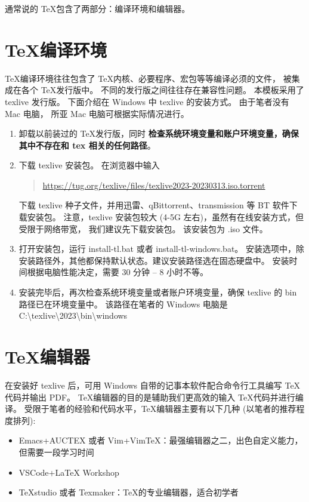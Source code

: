 \documentclass[twoside,doctor]{zjnuthesis}
\begin{document}
通常说的 \TeX 包含了两部分：编译环境和编辑器。 

\section{\TeX 编译环境}

\TeX 编译环境往往包含了 \TeX 内核、必要程序、宏包等等编译必须的文件，
被集成在各个 \TeX 发行版中。
不同的发行版之间往往存在兼容性问题。
本模板采用了 texlive 发行版。
下面介绍在 Windows 中 texlive 的安装方式。
由于笔者没有 Mac 电脑，
所亚 Mac 电脑可根据实际情况进行。

\begin{enumerate}[1.]
\item 卸载以前装过的 \TeX 发行版，同时
  \textbf{检查系统环境变量和账户环境变量，确保其中不存在和 tex 相关的任何路径}。
  
\item 下载 texlive 安装包。
  在浏览器中输入
  \begin{quote}
    \url{https://tug.org/texlive/files/texlive2023-20230313.iso.torrent}
  \end{quote}
  下载 texlive 种子文件，并用迅雷、qBittorrent、transmission 等 BT 软件下载安装包。
  注意，texlive 安装包较大 (4-5G 左右)，虽然有在线安装方式，但受限于网络带宽，
  我们建议先下载安装包。
  该安装包为 .iso 文件。
  
\item 打开安装包，运行 install-tl.bat 或者 install-tl-windows.bat。
  安装选项中，除安装路径外，其他都保持默认状态。建议安装路径选在固态硬盘中。
  安装时间根据电脑性能决定，需要 30 分钟 -- 8 小时不等。
  
\item 安装完毕后，再次检查系统环境变量或者账户环境变量，确保 texlive 的 bin 路径已在环境变量中。
  该路径在笔者的 Windows 电脑是 C:{\textbackslash}texlive{\textbackslash}2023{\textbackslash}bin{\textbackslash}windows
\end{enumerate}

\section{\TeX 编辑器}

在安装好 texlive 后，可用 Windows 自带的记事本软件配合命令行工具编写 \TeX 代码并输出 PDF。
\TeX 编辑器的目的是辅助我们更高效的输入 \TeX 代码并进行编译。
受限于笔者的经验和代码水平，\TeX 编辑器主要有以下几种 (以笔者的推荐程度排列):
\begin{itemize}
\item Emacs\textsc{+}AUCTEX 或者 Vim\textsc{+}VimTeX：最强编辑器之二，出色自定义能力，但需要一段学习时间
\item VSCode\textsc{+}LaTeX Workshop
\item TeXstudio 或者 Texmaker：\TeX 的专业编辑器，适合初学者
\end{itemize}
\end{document}
